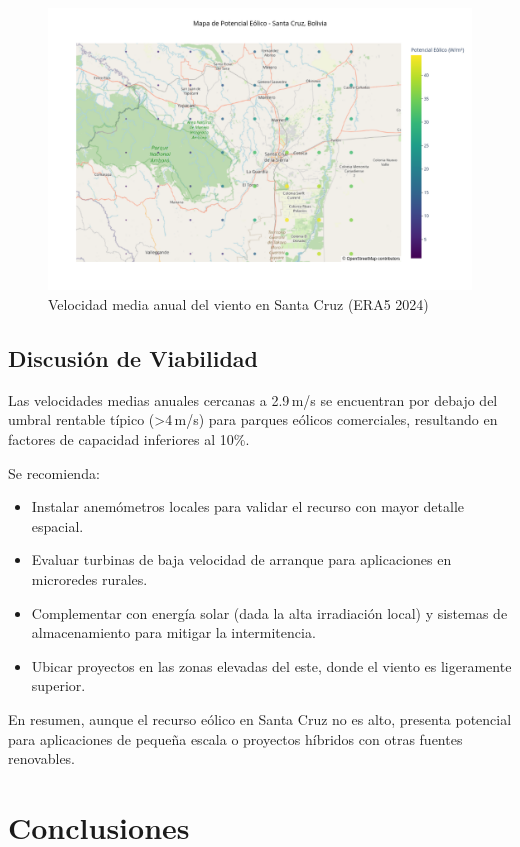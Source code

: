 \documentclass[a4paper,12pt]{article}
\begin{document}
	\begin{figure}[H]
		\centering
		\includegraphics[width=1.0\textwidth]{mapa_velocidades.png}
		\caption{Velocidad media anual del viento en Santa Cruz (ERA5 2024)}
		\label{fig:mapa}
	\end{figure}
	
	\subsection{Discusión de Viabilidad}
	Las velocidades medias anuales cercanas a 2.9\,m/s se encuentran por debajo del umbral rentable típico (>4\,m/s) para parques eólicos comerciales, resultando en factores de capacidad inferiores al 10\%. 
	
	Se recomienda:
	\begin{itemize}
		\item Instalar anemómetros locales para validar el recurso con mayor detalle espacial.
		\item Evaluar turbinas de baja velocidad de arranque para aplicaciones en microredes rurales.
		\item Complementar con energía solar (dada la alta irradiación local) y sistemas de almacenamiento para mitigar la intermitencia.
		\item Ubicar proyectos en las zonas elevadas del este, donde el viento es ligeramente superior.
	\end{itemize}
	
	En resumen, aunque el recurso eólico en Santa Cruz no es alto, presenta potencial para aplicaciones de pequeña escala o proyectos híbridos con otras fuentes renovables.
	
		
	\section{Conclusiones}
\end{document}
